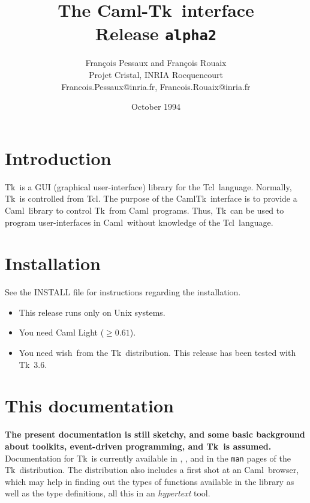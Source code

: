 
\newcommand{\tcl}{{\sf Tcl}}
\newcommand{\tk}{{\sf Tk}}
\newcommand{\caml}{{\sf Caml}}
\newcommand{\camltk}{{\sf CamlTk}}
\newcommand{\wish}{{\sf wish}}
\newcommand{\thisrelease}{{\tt alpha2}}
\title{The \caml-\tk\ interface \\
       Release \thisrelease}
\author{Fran\c{c}ois Pessaux and Fran\c{c}ois Rouaix \\
           Projet Cristal, INRIA Rocquencourt \\
        {\small Francois.Pessaux@inria.fr, Francois.Rouaix@inria.fr}
        }
\date{October 1994}

\maketitle


\section*{Introduction}
\tk\ is a GUI (graphical user-interface) library for the \tcl\ language.
Normally, \tk\ is controlled from \tcl. The purpose of the \camltk\
interface is to provide a \caml\ library to control \tk\ from \caml\
programs. Thus, \tk\ can be used to program user-interfaces in \caml\
without knowledge of the \tcl\ language.

\section*{Installation}
See the INSTALL file for instructions regarding the installation.
\begin{itemize}
\item This release runs only on Unix systems.
\item You need Caml Light ($\geq 0.61$).
\item You need \wish\, from the \tk\ distribution. This release has been
tested with \tk\ 3.6.
\end{itemize} 


\section*{This documentation}
{\bf The present documentation is still sketchy, and some basic background
about toolkits, event-driven programming, and \tk\ is assumed.}
Documentation for \tk\ is currently available in \cite{ouster94},
\cite{welch94}, and in the {\tt man} pages of the \tk\ distribution.
The distribution also includes a first shot at an \caml\ browser, which may
help in finding out the types of functions available in the library as well as
the type definitions, all this in an {\em hypertext} tool.


